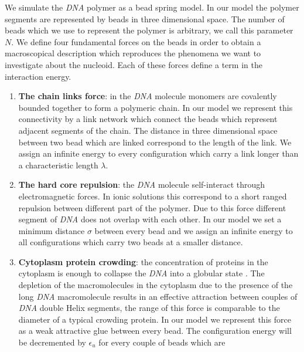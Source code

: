 \documentclass[12pt,a4paper,notitlepage]{article}
\newcommand{\dna}{\emph{DNA}\xspace}
\begin{document}
We simulate the \dna polymer as a bead spring model. In our model the
polymer segments are represented by beads in three dimensional
space. The number of beads which we use to represent the polymer is
arbitrary, we call this parameter $N$. We define four fundamental
forces on the beads in order to obtain a macroscopical description
which reproduces the phenomena we want to investigate about the
nucleoid. Each of these forces define a term in the interaction
energy.
\begin{enumerate}
\item
  {\bf The chain links force}: in the \dna molecule monomers are
  covalently bounded together to form a polymeric chain. In our model
  we represent this connectivity by a link network which connect
  the beads which represent adjacent segments of the chain. The
  distance in three dimensional space between two bead which are
  linked correspond to the length of the link.
  We assign an infinite energy to every configuration which carry a
  link longer than a characteristic length $\lambda$.
\item
  {\bf The hard core repulsion}: the \dna molecule self-interact
  through electromagnetic forces. In ionic solutions this correspond
  to a short ranged repulsion between different part of the
  polymer. Due to this force different segment of \dna does not overlap
  with each other. In our model we set a minimum distance $\sigma$
  between every bead and we assign an infinite energy to all
  configurations which carry two beads at a smaller distance.
\item
  {\bf Cytoplasm protein crowding}: the concentration of proteins in the
  cytoplasm is enough to collapse the \dna into a globular state
  \cite{Pelletier2012}. The depletion of the macromolecules in the
  cytoplasm due to the presence of the long \dna macromolecule results
  in an effective attraction between couples of \dna double Helix
  segments, the range of this force is comparable to the diameter of a
  typical crowding protein. In our model we represent this force as a
  weak attractive glue between every bead. The configuration energy will
  be decremented by $\epsilon_u$ for every couple of beads which are

\end{enumerate}
\end{document}

